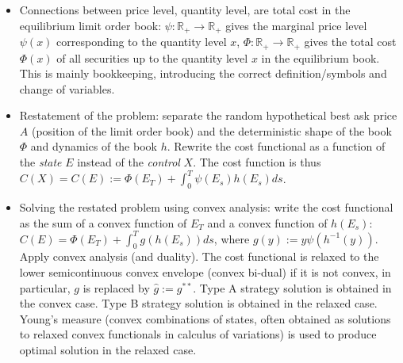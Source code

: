 \documentclass[openany,oneside]{article}
\theoremstyle{definition}
\theoremstyle{remark}
\begin{document}
\begin{itemize}
\begin{itemize}
\item Connections between price level, quantity level, are total cost in the equilibrium limit order book: $\psi:\mathbb{R}_+ \to \mathbb{R}_+$ gives the marginal price level $\psi(x)$ corresponding to the quantity level $x$, $\Phi:\mathbb{R}_+ \to \mathbb{R}_+$ gives the total cost $\Phi(x)$ of all securities up to the quantity level $x$ in the equilibrium book. This is mainly bookkeeping, introducing the correct definition/symbols and change of variables.

\item Restatement of the problem: separate the random hypothetical best ask price $A$ (position of the limit order book) and the deterministic shape of the book $\Phi$ and dynamics of the book $h$. Rewrite the cost functional as a function of the \emph{state} $E$ instead of the \emph{control} $X$. The cost function is thus $C(X) = C(E) := \Phi(E_T) + \int_0^T \psi(E_s) h(E_s) ds$.

\item Solving the restated problem using convex analysis: write the cost functional as the sum of a convex function of $E_T$ and a convex function of $h(E_s)$: $C(E) = \Phi(E_T) + \int_0^T g(h(E_s)) ds$, where $g(y) := y\psi(h^{-1}(y))$. Apply convex analysis (and duality). The cost functional is relaxed to the lower semicontinuous convex envelope (convex bi-dual) if it is not convex, in particular, $g$ is replaced by $\hat{g}:=g^{\ast\ast}$. Type A strategy solution is obtained in the convex case. Type B strategy solution is obtained in the relaxed case. Young's measure (convex combinations of states, often obtained as solutions to relaxed convex functionals in calculus of variations) is used to produce optimal solution in the relaxed case.
\end{itemize}

\end{itemize}
\end{document}
